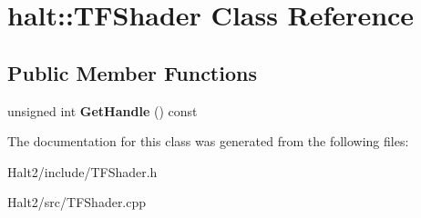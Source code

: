 \hypertarget{classhalt_1_1_t_f_shader}{\section{halt\-:\-:\-T\-F\-Shader \-Class \-Reference}
\label{classhalt_1_1_t_f_shader}
}
\subsection*{\-Public \-Member \-Functions}
\begin{DoxyCompactItemize}
\item 
\hypertarget{classhalt_1_1_t_f_shader_a83c94df7f9dd991f9eb2a8284bd94a2a}{unsigned int {\bfseries \-Get\-Handle} () const }\label{classhalt_1_1_t_f_shader_a83c94df7f9dd991f9eb2a8284bd94a2a}

\end{DoxyCompactItemize}


\-The documentation for this class was generated from the following files\-:\begin{DoxyCompactItemize}
\item 
\-Halt2/include/\-T\-F\-Shader.\-h\item 
\-Halt2/src/\-T\-F\-Shader.\-cpp\end{DoxyCompactItemize}
